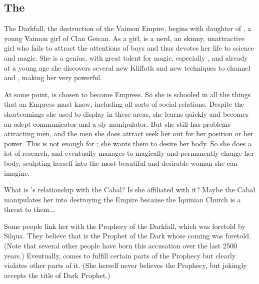 
\subsection{The \Darkfall}

The Darkfall, the destruction of the Vaimon Empire, begins with \Belzir{} daughter of \Cormin, a young Vaimon girl of Clan Geican. As a girl, \Belzir{} is a nerd, an skinny, unattractive girl who fails to attract the attentions of boys and thus devotes her life to science and magic. She is a genius, with great talent for magic, especially \nieur{}, and already at a young age she discovers several new Kliffoth and new techniques to channel \iquin{} and \nieur{}, making her very powerful. 

At some point, \Belzir{} is chosen to become Empress. So she is schooled in all the things that an Empress must know, including all sorts of social relations. Despite the shortcomings she used to display in these areas, she learns quickly and becomes an adept communicator and a sly manipulator. But she still has problems attracting men, and the men she does attract seek her out for her position or her power. This is not enough for \Belzir; she wants them to desire her body. So she does a lot of research, and eventually manages to magically and permanently change her body, sculpting herself into the most beautiful and desirable woman she can imagine. 

What is \Belzir's relationship with the Cabal? Is she affiliated with it? Maybe the Cabal manipulates her into destroying the Empire because the Iquinian Church is a threat to them... 

Some people link her with the Prophecy of the Darkfall, which was foretold by Silqua. They believe that \Belzir{} is the Prophet of the Dark whose coming was foretold. (Note that several other people have born this accusation over the last 2500 years.) Eventually, \Belzir{} comes to fulfill certain parts of the Prophecy but clearly violates other parts of it. (She herself never believes the Prophecy, but jokingly accepts the title of Dark Prophet.) 

